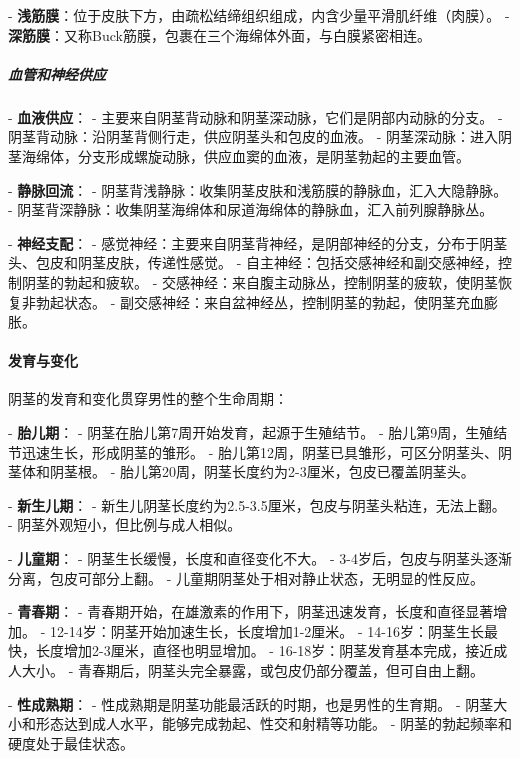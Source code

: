 - \textbf{浅筋膜}：位于皮肤下方，由疏松结缔组织组成，内含少量平滑肌纤维（肉膜）。
- \textbf{深筋膜}：又称Buck筋膜，包裹在三个海绵体外面，与白膜紧密相连。

\subparagraph{血管和神经供应}

- \textbf{血液供应}：
  - 主要来自阴茎背动脉和阴茎深动脉，它们是阴部内动脉的分支。
  - 阴茎背动脉：沿阴茎背侧行走，供应阴茎头和包皮的血液。
  - 阴茎深动脉：进入阴茎海绵体，分支形成螺旋动脉，供应血窦的血液，是阴茎勃起的主要血管。

- \textbf{静脉回流}：
  - 阴茎背浅静脉：收集阴茎皮肤和浅筋膜的静脉血，汇入大隐静脉。
  - 阴茎背深静脉：收集阴茎海绵体和尿道海绵体的静脉血，汇入前列腺静脉丛。

- \textbf{神经支配}：
  - 感觉神经：主要来自阴茎背神经，是阴部神经的分支，分布于阴茎头、包皮和阴茎皮肤，传递性感觉。
  - 自主神经：包括交感神经和副交感神经，控制阴茎的勃起和疲软。
    - 交感神经：来自腹主动脉丛，控制阴茎的疲软，使阴茎恢复非勃起状态。
    - 副交感神经：来自盆神经丛，控制阴茎的勃起，使阴茎充血膨胀。

\paragraph{发育与变化}

阴茎的发育和变化贯穿男性的整个生命周期：

- \textbf{胎儿期}：
  - 阴茎在胎儿第7周开始发育，起源于生殖结节。
  - 胎儿第9周，生殖结节迅速生长，形成阴茎的雏形。
  - 胎儿第12周，阴茎已具雏形，可区分阴茎头、阴茎体和阴茎根。
  - 胎儿第20周，阴茎长度约为2-3厘米，包皮已覆盖阴茎头。

- \textbf{新生儿期}：
  - 新生儿阴茎长度约为2.5-3.5厘米，包皮与阴茎头粘连，无法上翻。
  - 阴茎外观短小，但比例与成人相似。

- \textbf{儿童期}：
  - 阴茎生长缓慢，长度和直径变化不大。
  - 3-4岁后，包皮与阴茎头逐渐分离，包皮可部分上翻。
  - 儿童期阴茎处于相对静止状态，无明显的性反应。

- \textbf{青春期}：
  - 青春期开始，在雄激素的作用下，阴茎迅速发育，长度和直径显著增加。
  - 12-14岁：阴茎开始加速生长，长度增加1-2厘米。
  - 14-16岁：阴茎生长最快，长度增加2-3厘米，直径也明显增加。
  - 16-18岁：阴茎发育基本完成，接近成人大小。
  - 青春期后，阴茎头完全暴露，或包皮仍部分覆盖，但可自由上翻。

- \textbf{性成熟期}：
  - 性成熟期是阴茎功能最活跃的时期，也是男性的生育期。
  - 阴茎大小和形态达到成人水平，能够完成勃起、性交和射精等功能。
  - 阴茎的勃起频率和硬度处于最佳状态。

